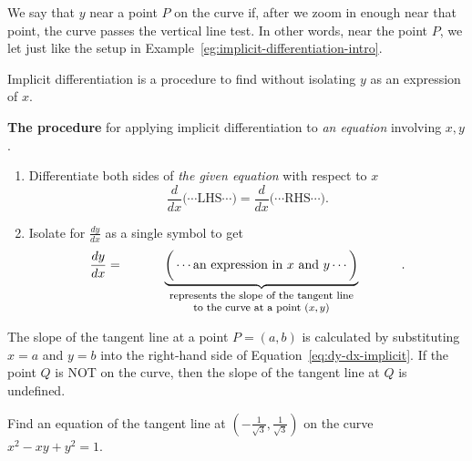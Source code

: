 \documentclass[../main.tex]{subfiles}
\begin{document}
We say that \(y\)  near a point \(P\) on the curve if, after we zoom in enough near that point, the curve passes the vertical line test. In other words, near the point \(P\), we let  just like the setup in Example~\ref{eg:implicit-differentiation-intro}.

Implicit differentiation is a procedure to find  without isolating \(y\) as an expression of \(x\).

\begin{mdframed}[style=simple-compact]
  \textbf{The procedure} for applying implicit differentiation to \emph{an equation} involving \(x,y\).

  \begin{enumerate}
    \item Differentiate both sides of \emph{the given equation} with respect to \(x\)
      \[
        \frac{d}{dx}\big(\cdots \text{LHS} \cdots \big) = \frac{d}{dx}\big(\cdots \text{RHS}\cdots\big).
      \]
    \item Isolate for \(\tfrac{dy}{dx}\) as a single symbol to get
      \begin{equation} \label{eq:dy-dx-implicit}
        \frac{dy}{dx} = \underbrace{\bigg(\cdots \text{an expression in \(x\) and \(y\)} \cdots\bigg)}_{\parbox{3in}{\centering \footnotesize represents the slope of the tangent line\\to the curve at a point \((x,y)\)}}.
      \end{equation}
  \end{enumerate}

  \faStar{} The slope of the tangent line at a point \(P=(a,b)\)  is calculated by substituting \(x=a\) and \(y=b\) into the right-hand side of Equation~\eqref{eq:dy-dx-implicit}. If the point \(Q\) is NOT on the curve, then the slope of the tangent line at \(Q\) is undefined.
\end{mdframed}

\begin{example} \label{eg:implicit-circle}
  Find an equation of the tangent line at \(\left(-\tfrac{1}{\sqrt{3}}, \tfrac{1}{\sqrt{3}}\right)\) on the curve \(x^{2} - xy + y^{2} = 1\).


  \blanks*
\end{example}
\clearpage
\end{document}
